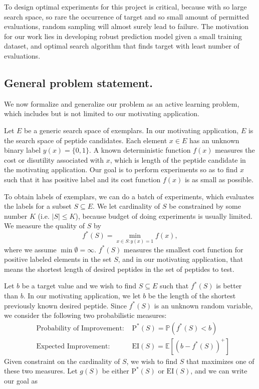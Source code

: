 \documentclass[opre,nonblindrev]{informs3} %
\newcommand{\E}{\mathbb{E}}
\newcommand{\EI}{\mathrm{EI}}
\newcommand{\PI}{\text{P}^*}
\begin{document}
To design optimal experiments for this project is critical, because with so large search space, so rare the occurrence of target and so small amount of permitted evaluations, random sampling will almost surely lead to failure. The motivation for our work lies in developing robust prediction model given a small training dataset, and optimal search algorithm that finds target with least number of evaluations.

\subsection{General problem statement.}
We now formalize and generalize our problem as an active learning problem, which includes but is not limited to our motivating application.

Let $E$ be a generic search space of exemplars.  In our motivating application, $E$ is the search space of peptide candidates. Each element $x \in E$ has an unknown binary label $y(x)=\{0,1\}$.  A known deterministic function $f(x)$ measures the cost or disutility associated with $x$, which is length of the peptide candidate in the motivating application. Our goal is to perform experiments so as to find $x$ such that it has positive label and its cost function $f(x)$ is as small as
possible.

To obtain labels of exemplars, we can do a batch of experiments, which evaluates the labels for a subset $S \subseteq E$. We let cardinality of $S$ be constrained by some number $K$ (i.e. $|S| \leq K$), because budget of doing experiments is usually limited. We measure the quality of $S$ by 
\begin{equation} \label{eq:fS}
f^*(S)= \underset{x \in S:y(x)=1}{\min} f(x),
\end{equation}
where we assume $\min \emptyset = \infty$. $f^*(S)$ measures the smallest cost function for positive labeled elements in the set $S$, and in our motivating application, that means the shortest length of desired peptides in the set of peptides to test.


Let $b$ be a target value and we wish to find $S\subseteq E$ such that $f^*(S)$ is better than $b$. In our motivating application, we let $b$ be the length of the shortest previously known desired peptide. Since $f^*(S)$ is an unknown random variable, we consider the following two probabilistic measures:
\begin{equation} \label{eq:twomeasure}
  \begin{aligned}
    &\text{Probability of Improvement: }&\PI(S) = \mathbb{P}(f^*(S) < b)\\
    &\text{Expected Improvement: }&\EI(S) = \E [(b-f^*(S))^+]
  \end{aligned}
\end{equation}
Given constraint on the cardinality of $S$, we wish to find $S$ that maximizes one of these two measures. Let $g(S)$ be either $\PI(S)$ or $\EI(S)$, and we can write our goal as
\end{document}
